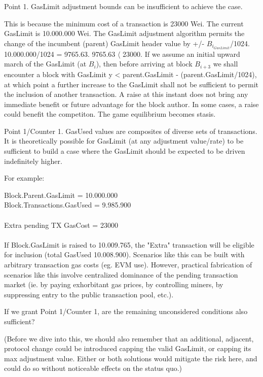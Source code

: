\documentclass[11pt]{article}
\theoremstyle{plain}
\begin{document}
Point 1. GasLimit adjustment bounds can be insufficient to achieve the case.

This is because the minimum cost of a transaction is 23000 Wei.
The current GasLimit is 10.000.000 Wei.
The GasLimit adjustment algorithm permits the change of the incumbent (parent)
GasLimit header value by +/- $B_{i}_{GasLimit}$/1024.
10.000.000/1024 = 9765.63.
9765.63 $\langle$ 23000.
If we assume an initial upward march of the GasLimit (at $B_{i}$), then before
arriving at block $B_{i+3}$ we shall encounter a
block with GasLimit y < parent.GasLimit - (parent.GasLimit/1024), at which
point a further increase to the GasLimit
shall not be sufficient to permit the inclusion of another transaction.
A raise at this instant does not bring any immediate benefit or future
advantage for the block author. In some cases, a raise could benefit the
competiton.
The game equilibrium becomes stasis.

Point 1/Counter 1. GasUsed values are composites of diverse sets of
transactions. It is theoretically possible for GasLimit (at any adjustment
value/rate) to be sufficient to build a case where
the GasLimit should be expected to be driven indefinitely higher. 

For example:

Block.Parent.GasLimit     = 10.000.000 \\
Block.Transactions.GasUsed = 9.985.900 \\
\\
Extra pending TX GasCost = 23000 \\
\\
If Block.GasLimit is raised to 10.009.765, the "Extra" transaction will be
eligible for inclusion (total GasUsed 10.008.900).
Scenarios like this can be built with arbitrary transaction gas costs (eg. EVM
use).
However, practical fabrication of scenarios like this involve centralized
dominance of the pending transaction market (ie. by paying exhorbitant gas
prices, by controlling miners, by suppressing entry to the public transaction
pool, etc.).

If we grant Point 1/Counter 1, are the remaining unconsidered conditions also
sufficient?

(Before we dive into this, we should also remember that an additional,
adjacent, protocol change could be introduced capping the valid GasLimit, or
capping its max adjustment value. Either or both solutions would mitigate the
risk here, and could do so without noticeable effects on the status quo.)
\end{document}
